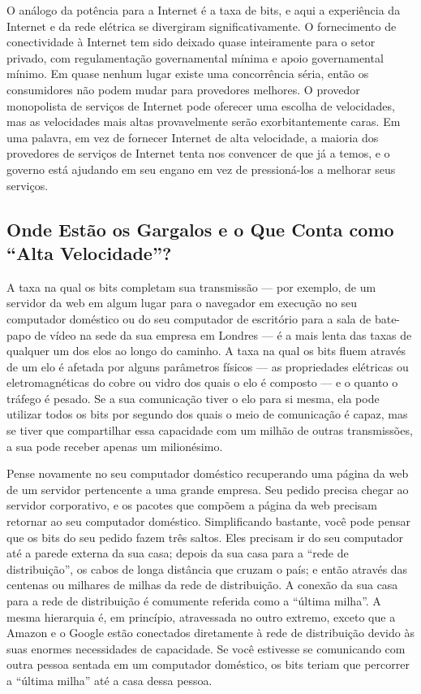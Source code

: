 O análogo da potência para a Internet é a taxa de bits, e aqui a experiência da Internet e da
rede elétrica se divergiram significativamente. O fornecimento de conectividade à Internet tem
sido deixado quase inteiramente para o setor privado, com regulamentação governamental mínima
e apoio governamental mínimo. Em quase nenhum lugar existe uma concorrência séria, então os
consumidores não podem mudar para provedores melhores. O provedor monopolista de serviços de
Internet pode oferecer uma escolha de velocidades, mas as velocidades mais altas provavelmente
serão exorbitantemente caras. Em uma palavra, em vez de fornecer Internet de alta velocidade,
a maioria dos provedores de serviços de Internet tenta nos convencer de que já a temos, e o
governo está ajudando em seu engano em vez de pressioná-los a melhorar seus serviços.

\subsection{Onde Estão os Gargalos e o Que Conta como ``Alta Velocidade''?}
\label{gatekeepers:gargalos}

A taxa na qual os bits completam sua transmissão --- por exemplo, de um servidor da web em
algum lugar para o navegador em execução no seu computador doméstico ou do seu computador de
escritório para a sala de bate-papo de vídeo na sede da sua empresa em Londres --- é a mais
lenta das taxas de qualquer um dos elos ao longo do caminho. A taxa na qual os bits fluem
através de um elo é afetada por alguns parâmetros físicos --- as propriedades elétricas ou
eletromagnéticas do cobre ou vidro dos quais o elo é composto --- e o quanto o tráfego é
pesado. Se a sua comunicação tiver o elo para si mesma, ela pode utilizar todos os bits por
segundo dos quais o meio de comunicação é capaz, mas se tiver que compartilhar essa capacidade
com um milhão de outras transmissões, a sua pode receber apenas um milionésimo.

Pense novamente no seu computador doméstico recuperando uma página da web de um servidor
pertencente a uma grande empresa. Seu pedido precisa chegar ao servidor corporativo, e os
pacotes que compõem a página da web precisam retornar ao seu computador doméstico.
Simplificando bastante, você pode pensar que os bits do seu pedido fazem três saltos. Eles
precisam ir do seu computador até a parede externa da sua casa; depois da sua casa para a
``rede de distribuição'', os cabos de longa distância que cruzam o país; e então através das
centenas ou milhares de milhas da rede de distribuição. A conexão da sua casa para a rede de
distribuição é comumente referida como a ``última milha''. A mesma hierarquia é, em princípio,
atravessada no outro extremo, exceto que a Amazon e o Google estão conectados diretamente à
rede de distribuição devido às suas enormes necessidades de capacidade. Se você estivesse se
comunicando com outra pessoa sentada em um computador doméstico, os bits teriam que percorrer
a ``última milha'' até a casa dessa pessoa.

